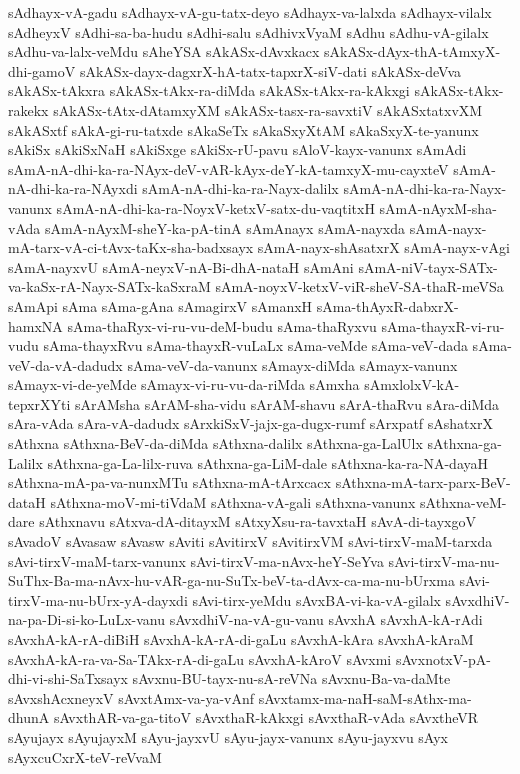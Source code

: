 {sAdhayx-vA-gadu
sAdhayx-vA-gu-tatx-deyo
sAdhayx-va-lalxda
sAdhayx-vilalx
sAdheyxV
sAdhi-sa-ba-hudu
sAdhi-salu
sAdhivxVyaM
sAdhu
sAdhu-vA-gilalx
sAdhu-va-lalx-veMdu
sAheYSA
sAkASx-dAvxkacx
sAkASx-dAyx-thA-tAmxyX-dhi-gamoV
sAkASx-dayx-dagxrX-hA-tatx-tapxrX-siV-dati
sAkASx-deVva
sAkASx-tAkxra
sAkASx-tAkx-ra-diMda
sAkASx-tAkx-ra-kAkxgi
sAkASx-tAkx-rakekx
sAkASx-tAtx-dAtamxyXM
sAkASx-tasx-ra-savxtiV
sAkASxtatxvXM
sAkASxtf
sAkA-gi-ru-tatxde
sAkaSeTx
sAkaSxyXtAM
sAkaSxyX-te-yanunx
sAkiSx
sAkiSxNaH
sAkiSxge
sAkiSx-rU-pavu
sAloV-kayx-vanunx
sAmAdi
sAmA-nA-dhi-ka-ra-NAyx-deV-vAR-kAyx-deY-kA-tamxyX-mu-cayxteV
sAmA-nA-dhi-ka-ra-NAyxdi
sAmA-nA-dhi-ka-ra-Nayx-dalilx
sAmA-nA-dhi-ka-ra-Nayx-vanunx
sAmA-nA-dhi-ka-ra-NoyxV-ketxV-satx-du-vaqtitxH
sAmA-nAyxM-sha-vAda
sAmA-nAyxM-sheY-ka-pA-tinA
sAmAnayx
sAmA-nayxda
sAmA-nayx-mA-tarx-vA-ci-tAvx-taKx-sha-badxsayx
sAmA-nayx-shAsatxrX
sAmA-nayx-vAgi
sAmA-nayxvU
sAmA-neyxV-nA-Bi-dhA-nataH
sAmAni
sAmA-niV-tayx-SATx-va-kaSx-rA-Nayx-SATx-kaSxraM
sAmA-noyxV-ketxV-viR-sheV-SA-thaR-meVSa
sAmApi
sAma
sAma-gAna
sAmagirxV
sAmanxH
sAma-thAyxR-dabxrX-hamxNA
sAma-thaRyx-vi-ru-vu-deM-budu
sAma-thaRyxvu
sAma-thayxR-vi-ru-vudu
sAma-thayxRvu
sAma-thayxR-vuLaLx
sAma-veMde
sAma-veV-dada
sAma-veV-da-vA-dadudx
sAma-veV-da-vanunx
sAmayx-diMda
sAmayx-vanunx
sAmayx-vi-de-yeMde
sAmayx-vi-ru-vu-da-riMda
sAmxha
sAmxlolxV-kA-tepxrXYti
sArAMsha
sArAM-sha-vidu
sArAM-shavu
sArA-thaRvu
sAra-diMda
sAra-vAda
sAra-vA-dadudx
sArxkiSxV-jajx-ga-dugx-rumf
sArxpatf
sAshatxrX
sAthxna
sAthxna-BeV-da-diMda
sAthxna-dalilx
sAthxna-ga-LalUlx
sAthxna-ga-Lalilx
sAthxna-ga-La-lilx-ruva
sAthxna-ga-LiM-dale
sAthxna-ka-ra-NA-dayaH
sAthxna-mA-pa-va-nunxMTu
sAthxna-mA-tArxcacx
sAthxna-mA-tarx-parx-BeV-dataH
sAthxna-moV-mi-tiVdaM
sAthxna-vA-gali
sAthxna-vanunx
sAthxna-veM-dare
sAthxnavu
sAtxva-dA-ditayxM
sAtxyXsu-ra-tavxtaH
sAvA-di-tayxgoV
sAvadoV
sAvasaw
sAvasw
sAviti
sAvitirxV
sAvitirxVM
sAvi-tirxV-maM-tarxda
sAvi-tirxV-maM-tarx-vanunx
sAvi-tirxV-ma-nAvx-heY-SeYva
sAvi-tirxV-ma-nu-SuThx-Ba-ma-nAvx-hu-vAR-ga-nu-SuTx-beV-ta-dAvx-ca-ma-nu-bUrxma
sAvi-tirxV-ma-nu-bUrx-yA-dayxdi
sAvi-tirx-yeMdu
sAvxBA-vi-ka-vA-gilalx
sAvxdhiV-na-pa-Di-si-ko-LuLx-vanu
sAvxdhiV-na-vA-gu-vanu
sAvxhA
sAvxhA-kA-rAdi
sAvxhA-kA-rA-diBiH
sAvxhA-kA-rA-di-gaLu
sAvxhA-kAra
sAvxhA-kAraM
sAvxhA-kA-ra-va-Sa-TAkx-rA-di-gaLu
sAvxhA-kAroV
sAvxmi
sAvxnotxV-pA-dhi-vi-shi-SaTxsayx
sAvxnu-BU-tayx-nu-sA-reVNa
sAvxnu-Ba-va-daMte
sAvxshAcxneyxV
sAvxtAmx-va-ya-vAnf
sAvxtamx-ma-naH-saM-sAthx-ma-dhunA
sAvxthAR-va-ga-titoV
sAvxthaR-kAkxgi
sAvxthaR-vAda
sAvxtheVR
sAyujayx
sAyujayxM
sAyu-jayxvU
sAyu-jayx-vanunx
sAyu-jayxvu
sAyx
sAyxcuCxrX-teV-reVvaM
}
